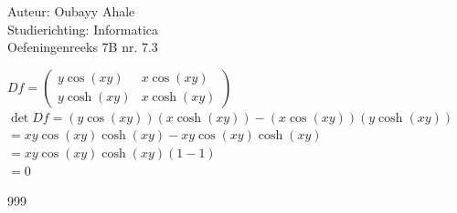 \documentclass[a4paper]{article}
\begin{document}
\noindent \large Auteur: Oubayy Ahale       \\
\noindent \large Studierichting: Informatica\\
\noindent \large Oefeningenreeks 7B nr. 7.3 \\

\medskip

\normalsize

$Df =\left( \begin{array}{cc}
	y \cos(xy) & x \cos(xy) \\
	y \cosh(xy) & x \cosh(xy)
\end{array}\right)$\\

$\det Df = (y \cos(xy))(x \cosh(xy)) - (x \cos(xy))(y \cosh(xy))$\\

$ = xy\cos(xy)\cosh(xy) - xy\cos(xy)\cosh(xy)$\\

$ = xy\cos(xy)\cosh(xy)(1-1) $\\

$ = 0$\\

\begin{thebibliography}{999}
\end{thebibliography}
\end{document}

